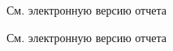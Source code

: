 \setcounter{section}{0}

См. электронную версию отчета
\label{lst:istu_report}
\label{lst:customCodes}


См. электронную версию отчета
\label{lst:lab1}